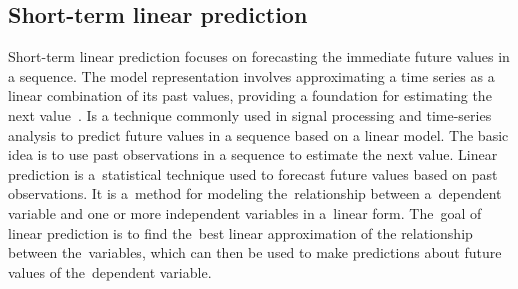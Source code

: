 \documentclass[12pt]{report}
\begin{document}
\subsection{Short-term linear prediction}\label{slp}
Short-term linear prediction focuses on forecasting the immediate future values in a sequence.
The model representation involves approximating a time series as a linear
combination of its past values, providing a foundation for estimating the next value~\cite{WOS:000836807400001}.
Is a technique commonly used in signal processing and time-series analysis to predict future
values in a sequence based on a linear model.
The basic idea is to use past observations in a sequence to estimate the next value.
Linear prediction is a~statistical technique used to forecast future values based on past
observations. It is a~method for modeling the~relationship between a~dependent variable and
one or more independent variables in a~linear form. The~goal of linear prediction is to find
the~best linear approximation of the relationship between the~variables, which can then be
used to make predictions about future values of the~dependent variable.
%
\end{document}
